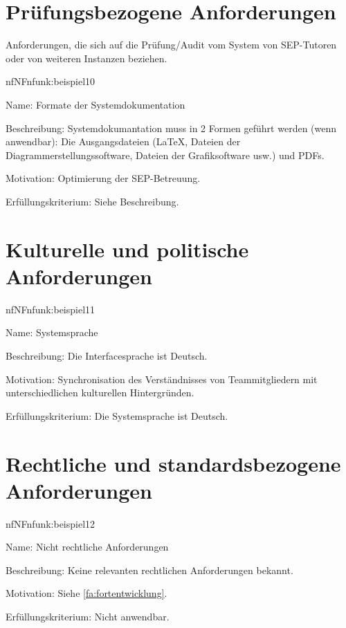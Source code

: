 \section{Prüfungsbezogene Anforderungen}

Anforderungen, die sich auf die Prüfung/Audit vom System von SEP-Tutoren oder von weiteren Instanzen beziehen.


\begin{description}[leftmargin=5em, style=sameline]	
	\begin{lhp}{nf}{NF}{nfunk:beispiel10}
		\item [Name:] Formate der Systemdokumentation
		\item [Beschreibung:] Systemdokumantation muss in 2 Formen geführt werden (wenn anwendbar): Die Ausgangsdateien (\LaTeX, Dateien der Diagrammerstellungssoftware, Dateien der Grafiksoftware usw.) und PDFs.
		\item [Motivation:] Optimierung der SEP-Betreuung.
		\item [Erfüllungskriterium:] Siehe Beschreibung.
	\end{lhp}
\end{description}

\section{Kulturelle und politische Anforderungen}


\begin{description}[leftmargin=5em, style=sameline]	
	\begin{lhp}{nf}{NF}{nfunk:beispiel11}
		\item [Name:] Systemsprache
		\item [Beschreibung:] Die Interfacesprache ist Deutsch.
		\item [Motivation:] Synchronisation des Verständnisses von Teammitgliedern mit unterschiedlichen kulturellen Hintergründen.
		\item [Erfüllungskriterium:] Die Systemsprache ist Deutsch.
	\end{lhp}
\end{description}

\section{Rechtliche und standardsbezogene Anforderungen}


\begin{description}[leftmargin=5em, style=sameline]	
	\begin{lhp}{nf}{NF}{nfunk:beispiel12}
		\item [Name:] Nicht rechtliche Anforderungen
		\item [Beschreibung:] Keine relevanten rechtlichen Anforderungen bekannt.
		\item [Motivation:] Siehe \ref{fa:fortentwicklung}.
		\item [Erfüllungskriterium:] Nicht anwendbar.
	\end{lhp}
\end{description}
